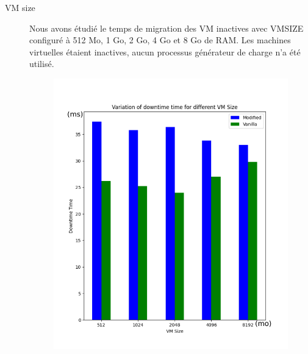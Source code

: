 \begin{description}
\item[VM size]

Nous avons étudié le temps de migration des VM inactives avec VMSIZE configuré à 512 Mo, 1 Go, 2 Go, 4 Go et 8 Go de RAM.
Les machines virtuelles étaient inactives, aucun processus générateur de charge n'a été utilisé.

\begin{figure}[H]
\begin{minipage}{0.48\textwidth}
\centering
\includegraphics[width=1\linewidth]{include/down_vmsize.png}
\end{minipage}\hfill
\begin{minipage}{0.48\textwidth}
\centering

\end{minipage}
\end{figure}
\end{description}
